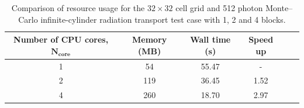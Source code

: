 \begin{table}[b!]
 \centering
 \small
 \caption{Comparison of resource usage for the $32 \times 32$ cell grid and 512 photon Monte--Carlo infinite-cylinder radiation transport test case with 1, 2 and 4 blocks.}
 \label{tab:slab_resource_usage}
  \begin{threeparttable}
 \begin{tabular*}{0.95\textwidth}%
     {@{\extracolsep{\fill}}cccccc}
  \hline \hline \textbf{Number of CPU cores}, $\mathbf{N_\text{core}}$                          &  \textbf{Memory (MB)}  &  \textbf{Wall time (s)} &   \textbf{Speed up} \\
 \hline                                                    1                                                                                   & 54                                    &   55.47                         &  - \\
                                                               2                                                                                   & 119                                  &   36.45                         & 1.52 \\
                                                               4                                                                                   & 260                                  &   18.70                         & 2.97 \\
  \hline
 \end{tabular*}
 \end{threeparttable}
\end{table}
